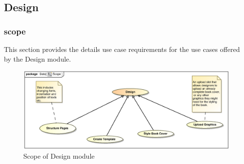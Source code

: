 \clearpage
\subsection{Design}

\subsubsection{scope}
\par{This section provides the details use case requirements for the use cases offered by the Design
module.}

\begin{figure}[h]
\includegraphics[scale=0.9,width=450px]{epsImages/Design/Scope.eps}
\centering
\caption{Scope of Design module}
\end{figure}

\newpage
